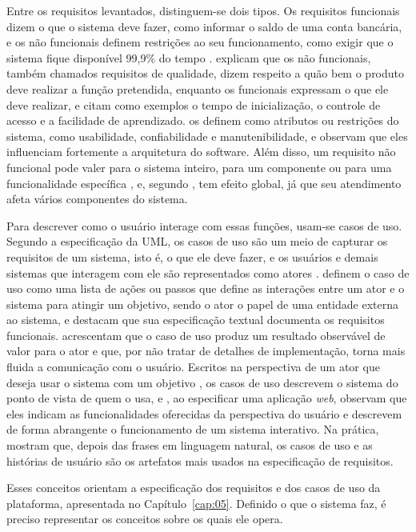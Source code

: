 Entre os requisitos levantados, distinguem-se dois tipos. Os requisitos funcionais dizem o que o sistema deve fazer, como informar o saldo de uma conta
bancária, e os não funcionais definem restrições ao seu funcionamento, como exigir que o sistema fique disponível 99,9\% do tempo \cite{Valente2020}.
 explicam que os não funcionais, também chamados requisitos de qualidade, dizem respeito a quão bem o produto deve realizar a
função pretendida, enquanto os funcionais expressam o que ele deve realizar, e citam como exemplos o tempo de inicialização, o controle de acesso e a facilidade
de aprendizado.  os definem como atributos ou restrições do sistema, como usabilidade, confiabilidade e manutenibilidade, e observam que
eles influenciam fortemente a arquitetura do software. Além disso, um requisito não funcional pode valer para o sistema inteiro, para um componente ou para uma
funcionalidade específica \cite{Habibullah2023}, e, segundo , tem efeito global, já que seu atendimento afeta
vários componentes do sistema.

Para descrever como o usuário interage com essas funções, usam-se casos de uso. Segundo a especificação da UML, os casos de uso são um meio de capturar os
requisitos de um sistema, isto é, o que ele deve fazer, e os usuários e demais sistemas que interagem com ele são representados como atores
\cite{OMG2017uml}.  definem o caso de uso como uma lista de ações ou passos que define as interações entre um ator e o sistema para
atingir um objetivo, sendo o ator o papel de uma entidade externa ao sistema, e destacam que sua especificação textual documenta os requisitos funcionais.
 acrescentam que o caso de uso produz um resultado observável de valor para o ator e que, por não tratar de detalhes de implementação,
torna mais fluida a comunicação com o usuário. Escritos na perspectiva de um ator que deseja usar o sistema com um objetivo \cite{Valente2020}, os casos
de uso descrevem o sistema do ponto de vista de quem o usa, e , ao especificar uma aplicação \textit{web}, observam que eles indicam as
funcionalidades oferecidas da perspectiva do usuário e descrevem de forma abrangente o funcionamento de um sistema interativo. Na prática,
 mostram que, depois das frases em linguagem natural, os casos de uso e as histórias de usuário são os artefatos mais usados na
especificação de requisitos.

Esses conceitos orientam a especificação dos requisitos e dos casos de uso da plataforma, apresentada no Capítulo~\ref{cap:05}. Definido o que o sistema faz, é
preciso representar os conceitos sobre os quais ele opera.


